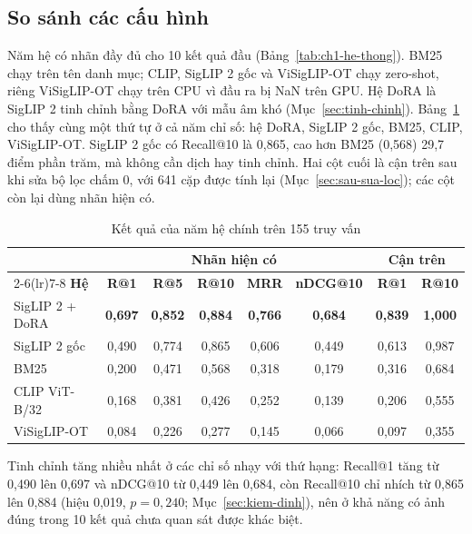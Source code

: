 \subsection{So sánh các cấu hình}
\label{sec:so-sanh-cau-hinh}

Năm hệ có nhãn đầy đủ cho 10 kết quả đầu (Bảng~\ref{tab:ch1-he-thong}). BM25 chạy trên tên danh mục; CLIP, SigLIP 2 gốc và ViSigLIP-OT chạy zero-shot, riêng ViSigLIP-OT chạy trên CPU vì đầu ra bị NaN trên GPU. Hệ DoRA là SigLIP 2 tinh chỉnh bằng DoRA với mẫu âm khó (Mục~\ref{sec:tinh-chinh}). Bảng~\ref{tab:ket-qua-chinh} cho thấy cùng một thứ tự ở cả năm chỉ số: hệ DoRA, SigLIP 2 gốc, BM25, CLIP, ViSigLIP-OT. SigLIP 2 gốc có Recall@10 là 0,865, cao hơn BM25 (0,568) 29,7 điểm phần trăm, mà không cần dịch hay tinh chỉnh. Hai cột cuối là cận trên sau khi sửa bộ lọc chấm 0, với 641 cặp được tính lại (Mục~\ref{sec:sau-sua-loc}); các cột còn lại dùng nhãn hiện có.

\begin{table}[H]
\centering
\caption{Kết quả của năm hệ chính trên 155 truy vấn}
\label{tab:ket-qua-chinh}
\footnotesize
\renewcommand{\arraystretch}{1.05}
\setlength{\tabcolsep}{4pt}
\begin{tabular}{@{}l ccccc cc@{}}
\toprule
 & \multicolumn{5}{c}{\textbf{Nhãn hiện có}} & \multicolumn{2}{c}{\textbf{Cận trên}} \\
\cmidrule(lr){2-6}\cmidrule(lr){7-8}
\textbf{Hệ} & \textbf{R@1} & \textbf{R@5} & \textbf{R@10} & \textbf{MRR} & \textbf{nDCG@10} & \textbf{R@1} & \textbf{R@10} \\
\midrule
SigLIP 2 + DoRA & \textbf{0,697} & \textbf{0,852} & \textbf{0,884} & \textbf{0,766} & \textbf{0,684} & \textbf{0,839} & \textbf{1,000} \\
SigLIP 2 gốc & 0,490 & 0,774 & 0,865 & 0,606 & 0,449 & 0,613 & 0,987 \\
BM25 & 0,200 & 0,471 & 0,568 & 0,318 & 0,179 & 0,316 & 0,684 \\
CLIP ViT-B/32 & 0,168 & 0,381 & 0,426 & 0,252 & 0,139 & 0,206 & 0,555 \\
ViSigLIP-OT & 0,084 & 0,226 & 0,277 & 0,145 & 0,066 & 0,097 & 0,355 \\
\bottomrule
\end{tabular}
\end{table}

Tinh chỉnh tăng nhiều nhất ở các chỉ số nhạy với thứ hạng: Recall@1 tăng từ 0,490 lên 0,697 và nDCG@10 từ 0,449 lên 0,684, còn Recall@10 chỉ nhích từ 0,865 lên 0,884 (hiệu 0,019, $p = 0{,}240$; Mục~\ref{sec:kiem-dinh}), nên ở khả năng có ảnh đúng trong 10 kết quả chưa quan sát được khác biệt.

